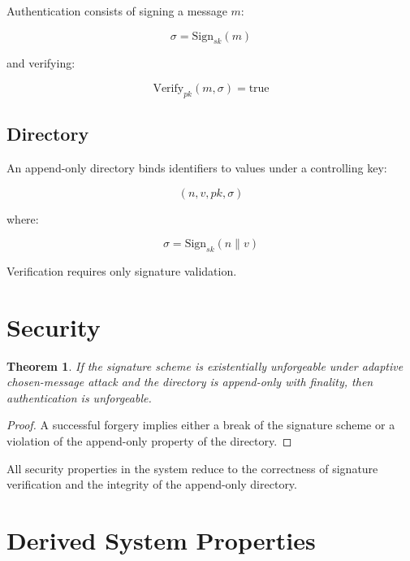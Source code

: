 \documentclass[11pt,a4paper]{article}
\newtheorem{theorem}{Theorem}[section]
\begin{document}
Authentication consists of signing a message $m$:

\begin{equation}
\sigma = \text{Sign}_{sk}(m)
\end{equation}

and verifying:

\begin{equation}
\text{Verify}_{pk}(m, \sigma) = \text{true}
\end{equation}

\subsection{Directory}

An append-only directory binds identifiers to values under a controlling key:

\begin{equation}
(n, v, pk, \sigma)
\end{equation}

where:

\begin{equation}
\sigma = \text{Sign}_{sk}(n \parallel v)
\end{equation}

Verification requires only signature validation.

\section{Security}

\begin{theorem}
If the signature scheme is existentially unforgeable under adaptive chosen-message attack and the directory is append-only with finality, then authentication is unforgeable.
\end{theorem}

\begin{proof}
A successful forgery implies either a break of the signature scheme or a violation of the append-only property of the directory.
\end{proof}

All security properties in the system reduce to the correctness of signature verification and the integrity of the append-only directory.

\section{Derived System Properties}
\end{document}
